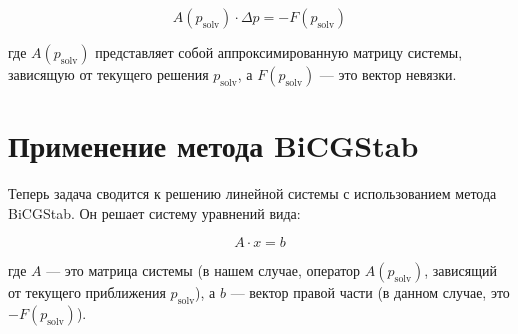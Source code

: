 \documentclass[12pt]{amsart}
\begin{document}
\[
A(p_{\text{solv}}) \cdot \Delta p = -F(p_{\text{solv}})
\]

где \( A(p_{\text{solv}}) \) представляет собой аппроксимированную матрицу системы, зависящую от текущего решения \( p_{\text{solv}} \), а \( F(p_{\text{solv}}) \) — это вектор невязки.

\section{Применение метода BiCGStab}

Теперь задача сводится к решению линейной системы с использованием метода BiCGStab. Он решает систему уравнений вида:

\[
A \cdot x = b
\]

где \( A \) — это матрица системы (в нашем случае, оператор \( A(p_{\text{solv}}) \), зависящий от текущего приближения \( p_{\text{solv}} \)), а \( b \) — вектор правой части (в данном случае, это \( -F(p_{\text{solv}}) \)).
\end{document}
